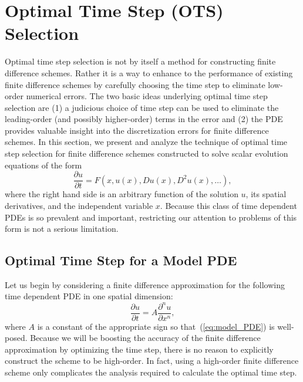 \documentclass[fleqn,12pt,twoside]{article}
\newcommand{\beq}{\begin{equation}}
\newcommand{\eeq}{\end{equation}}
\begin{document}
\section{\label{sec:optimal_time_step_selection} 
         Optimal Time Step (OTS) Selection}
Optimal time step selection is not by itself a method for constructing 
finite difference schemes.  Rather it is a way to enhance to the performance
of existing finite difference schemes by carefully choosing the time step to 
eliminate low-order numerical errors.  The two basic ideas underlying 
optimal time step selection are 
(1) a judicious choice of time step can be used to eliminate the leading-order 
(and possibly higher-order) terms in the error
and
(2) the PDE provides valuable insight into the discretization errors for 
finite difference schemes.
In this section, we present and analyze the technique of optimal time step 
selection for finite difference schemes constructed to solve scalar evolution 
equations of the form 
\beq
  \frac{\partial u}{\partial t} = 
    F\left(x, u(x), D u(x), D^2 u(x), \ldots \right), 
\eeq
where the right hand side is an arbitrary function of the solution $u$, its 
spatial derivatives, and the independent variable $x$.
Because this class of time dependent PDEs is so prevalent and important, 
restricting our attention to problems of this form is not a serious 
limitation.  


\subsection{\label{sec:ots_model_pde} 
            Optimal Time Step for a Model PDE}
Let us begin by considering a finite difference approximation for the
following time dependent PDE in one spatial dimension: 
\beq
  \frac{\partial u}{\partial t} = A \frac{\partial^n u}{\partial x^n},
  \label{eq:model_PDE}
\eeq
where $A$ is a constant of the appropriate sign so that~(\ref{eq:model_PDE}) 
is well-posed.  Because we will be boosting the accuracy of the finite 
difference approximation by optimizing the time step, there is no reason to 
explicitly construct the scheme to be high-order.  In fact, using a high-order 
finite difference scheme only complicates the analysis required to calculate 
the optimal time step.  
\end{document}
